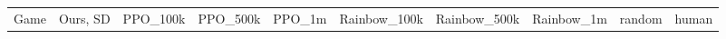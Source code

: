 \begin{landscape}
\begin{changemargin}{0cm}{0cm}
\begin{center}
\vspace*{\fill}
\setlength{\tabcolsep}{5pt}
\begin{table}[!htbp]
\scriptsize
\begin{tabular}{l|rl|rl|rl|rl|rl|rl|rl|c|c}

Game &          \multicolumn{2}{|c|}{Ours, SD}  &     \multicolumn{2}{|c|}{PPO\_100k}   &     \multicolumn{2}{|c|}{PPO\_500k} &     \multicolumn{2}{|c|}{PPO\_1m}   &     \multicolumn{2}{|c|}{Rainbow\_100k} &          \multicolumn{2}{|c|}{Rainbow\_500k}	&     \multicolumn{2}{|c|}{Rainbow\_1m} &		random &		human\\



\end{tabular}
\end{table}
\end{center}
\end{changemargin}
\end{landscape}
